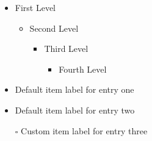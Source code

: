 \documentclass{article}
\begin{document}
\renewcommand{\labelitemi}{$\blacksquare$}
\renewcommand\labelitemii{$\square$}
\begin{itemize}
    \item  First Level
        \begin{itemize}
            \item  Second Level
                \begin{itemize}
                    \item  Third Level
                        \begin{itemize}
                            \item  Fourth Level
                        \end{itemize}
                \end{itemize}
        \end{itemize}
\end{itemize}

\begin{itemize}
    \item  Default item label for entry one
    \item  Default item label for entry two
    \item[$\square$]  Custom item label for entry three
\end{itemize}
\end{document}
